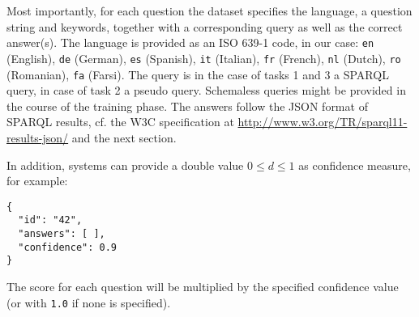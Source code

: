 Most importantly, for each question the dataset specifies the language, a question string and keywords,
together with a corresponding query as well as the correct answer(s).
The language is provided as an ISO 639-1 code, in our case:
\texttt{en} (English), \texttt{de} (German), \texttt{es} (Spanish), \texttt{it} (Italian), \texttt{fr} (French), \texttt{nl} (Dutch), \texttt{ro} (Romanian), \texttt{fa} (Farsi).
The query is in the case of tasks 1 and 3 a SPARQL query, in case of task 2 a pseudo query. Schemaless queries might be provided in the course of the training phase.
The answers follow the JSON format of SPARQL results, cf. the W3C specification at \url{http://www.w3.org/TR/sparql11-results-json/} and the next section.
%
%
%

In addition, systems can provide a double value $0\leq d\leq 1$ as confidence measure, for example:

\begin{lstlisting}
{
  "id": "42",
  "answers": [ ],
  "confidence": 0.9
}
\end{lstlisting}

The score for each question will be multiplied by the specified confidence value (or with \texttt{1.0} if none is specified).
